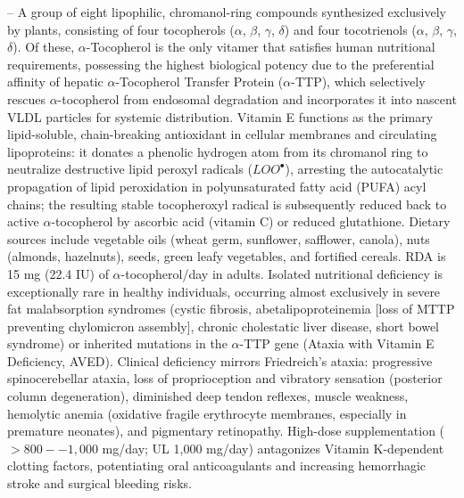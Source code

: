-- A group of eight lipophilic, chromanol-ring compounds synthesized exclusively by plants, consisting of four tocopherols ($\alpha$, $\beta$, $\gamma$, $\delta$) and four tocotrienols ($\alpha$, $\beta$, $\gamma$, $\delta$). Of these, $\alpha$-Tocopherol is the only vitamer that satisfies human nutritional requirements, possessing the highest biological potency due to the preferential affinity of hepatic $\alpha$-Tocopherol Transfer Protein ($\alpha$-TTP), which selectively rescues $\alpha$-tocopherol from endosomal degradation and incorporates it into nascent VLDL particles for systemic distribution. Vitamin E functions as the primary lipid-soluble, chain-breaking antioxidant in cellular membranes and circulating lipoproteins: it donates a phenolic hydrogen atom from its chromanol ring to neutralize destructive lipid peroxyl radicals ($LOO^\bullet$), arresting the autocatalytic propagation of lipid peroxidation in polyunsaturated fatty acid (PUFA) acyl chains; the resulting stable tocopheroxyl radical is subsequently reduced back to active $\alpha$-tocopherol by ascorbic acid (vitamin C) or reduced glutathione. Dietary sources include vegetable oils (wheat germ, sunflower, safflower, canola), nuts (almonds, hazelnuts), seeds, green leafy vegetables, and fortified cereals. RDA is 15 mg (22.4 IU) of $\alpha$-tocopherol/day in adults. Isolated nutritional deficiency is exceptionally rare in healthy individuals, occurring almost exclusively in severe fat malabsorption syndromes (cystic fibrosis, abetalipoproteinemia [loss of MTTP preventing chylomicron assembly], chronic cholestatic liver disease, short bowel syndrome) or inherited mutations in the $\alpha$-TTP gene (Ataxia with Vitamin E Deficiency, AVED). Clinical deficiency mirrors Friedreich's ataxia: progressive spinocerebellar ataxia, loss of proprioception and vibratory sensation (posterior column degeneration), diminished deep tendon reflexes, muscle weakness, hemolytic anemia (oxidative fragile erythrocyte membranes, especially in premature neonates), and pigmentary retinopathy. High-dose supplementation ($>800--1,000$ mg/day; UL 1,000 mg/day) antagonizes Vitamin K-dependent clotting factors, potentiating oral anticoagulants and increasing hemorrhagic stroke and surgical bleeding risks.

